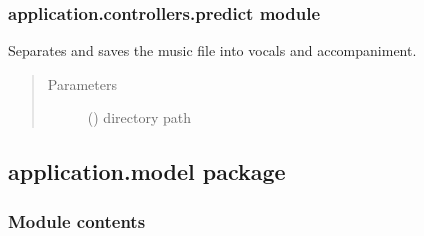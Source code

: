 \documentclass[letterpaper,10pt,english]{sphinxmanual}
\begin{document}
\subsubsection{application.controllers.predict module}
\label{\detokenize{docs/source/application.controllers:module-application.controllers.predict}}\label{\detokenize{docs/source/application.controllers:application-controllers-predict-module}}

\begin{fulllineitems}
\label{\detokenize{docs/source/application.controllers:application.controllers.predict.separate_file}}
Separates and saves the music file into vocals and accompaniment.
\begin{quote}\begin{description}
\item[{Parameters}] \leavevmode
{} () \textendash{} directory path

\end{description}\end{quote}

\end{fulllineitems}



\subsection{application.model package}
\label{\detokenize{docs/source/application.model:application-model-package}}\label{\detokenize{docs/source/application.model::doc}}

\subsubsection{Module contents}
\label{\detokenize{docs/source/application.model:module-application.model}}\label{\detokenize{docs/source/application.model:module-contents}}
\end{document}

